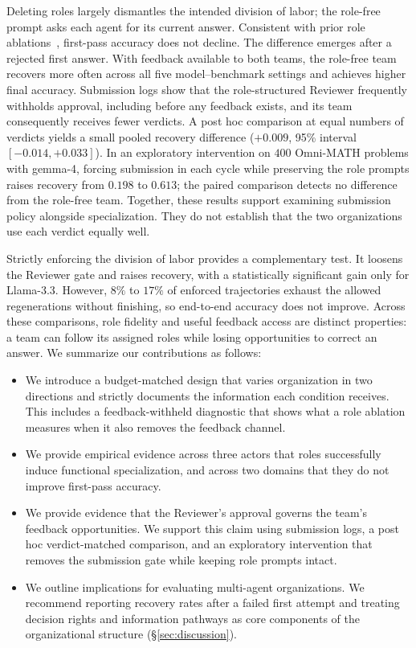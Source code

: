 Deleting roles largely dismantles the intended division of labor; the
role-free prompt asks each agent for its current answer. Consistent with
prior role ablations~\cite{dylan2026equal,orogat2026architectural}, first-pass
accuracy does not decline. The difference emerges after a rejected first
answer. With feedback available to both teams, the role-free team recovers
more often across all five model--benchmark settings and achieves higher
final accuracy. Submission logs show that the role-structured Reviewer
frequently withholds approval, including before any feedback exists, and
its team consequently receives fewer verdicts. A post hoc comparison at
equal numbers of verdicts yields a small pooled recovery difference
($+0.009$, 95\% interval $[-0.014,+0.033]$). In an exploratory intervention
on $400$ Omni-MATH problems with gemma-4, forcing submission in each cycle
while preserving the role prompts raises recovery from $0.198$ to $0.613$;
the paired comparison detects no difference from the role-free team.
Together, these results support examining submission policy alongside
specialization. They do not establish that the two organizations use each
verdict equally well.

Strictly enforcing the division of labor provides a complementary test.
It loosens the Reviewer gate and raises recovery, with a statistically significant gain only
for Llama-3.3. However, $8\%$ to $17\%$ of enforced trajectories exhaust the
allowed regenerations without finishing, so end-to-end accuracy does not
improve. Across these comparisons, role fidelity and useful feedback access
are distinct properties: a team can follow its assigned roles while losing
opportunities to correct an answer.
We summarize our contributions as follows:
\begin{itemize}
\item[(1)] We introduce a budget-matched design that varies organization in
  two directions and strictly documents the information each condition
  receives. This includes a feedback-withheld diagnostic that shows what a
  role ablation measures when it also removes the feedback channel.
\item[(2)] We provide empirical evidence across three actors that roles
  successfully induce functional specialization, and across two domains
  that they do not improve first-pass accuracy.
\item[(3)] We provide evidence that the Reviewer's approval governs the
  team's feedback opportunities. We support this claim using submission
  logs, a post hoc verdict-matched comparison, and an exploratory
  intervention that removes the submission gate while keeping role prompts
  intact.
\item[(4)] We outline implications for evaluating multi-agent
  organizations. We recommend reporting recovery rates after a failed first
  attempt and treating decision rights and information pathways as core
  components of the organizational structure (\S\ref{sec:discussion}).
\end{itemize}
